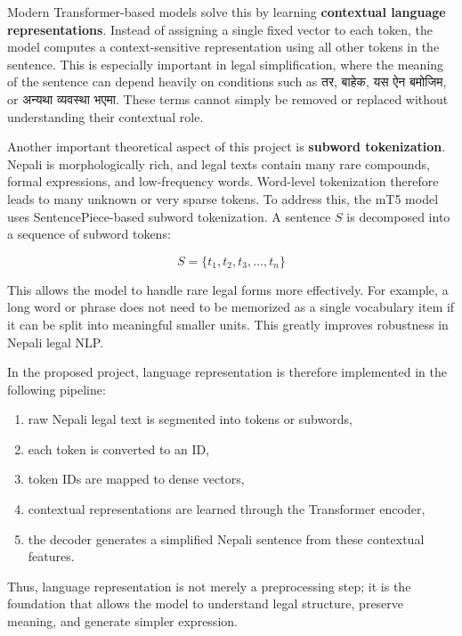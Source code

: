 \documentclass[12pt]{report}
\begin{document}
Modern Transformer-based models solve this by learning \textbf{contextual language representations}. Instead of assigning a single fixed vector to each token, the model computes a context-sensitive representation using all other tokens in the sentence. This is especially important in legal simplification, where the meaning of the sentence can depend heavily on conditions such as {\devanagarifont तर}, {\devanagarifont बाहेक}, {\devanagarifont यस ऐन बमोजिम}, or {\devanagarifont अन्यथा व्यवस्था भएमा}. These terms cannot simply be removed or replaced without understanding their contextual role.

Another important theoretical aspect of this project is \textbf{subword tokenization}. Nepali is morphologically rich, and legal texts contain many rare compounds, formal expressions, and low-frequency words. Word-level tokenization therefore leads to many unknown or very sparse tokens. To address this, the mT5 model uses SentencePiece-based subword tokenization. A sentence $S$ is decomposed into a sequence of subword tokens:

\begin{equation}
S = \{t_1, t_2, t_3, \dots, t_n\}
\end{equation}

This allows the model to handle rare legal forms more effectively. For example, a long word or phrase does not need to be memorized as a single vocabulary item if it can be split into meaningful smaller units. This greatly improves robustness in Nepali legal NLP.

In the proposed project, language representation is therefore implemented in the following pipeline:
\begin{enumerate}
    \item raw Nepali legal text is segmented into tokens or subwords,
    \item each token is converted to an ID,
    \item token IDs are mapped to dense vectors,
    \item contextual representations are learned through the Transformer encoder,
    \item the decoder generates a simplified Nepali sentence from these contextual features.
\end{enumerate}

Thus, language representation is not merely a preprocessing step; it is the foundation that allows the model to understand legal structure, preserve meaning, and generate simpler expression.
\end{document}
